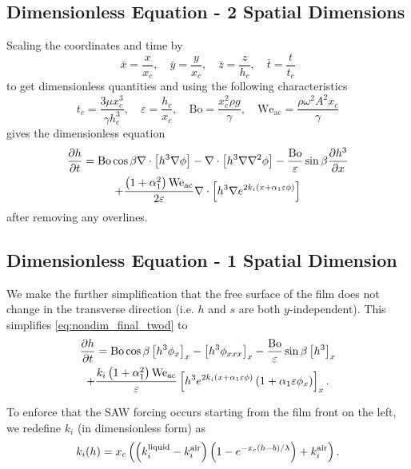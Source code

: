 \subsection{Dimensionless Equation - 2 Spatial Dimensions}
\begin{frame}
    Scaling the coordinates and time by 
    \begin{equation*}
        \bar{x} = \frac{x}{x_c}, \quad \bar{y} = \frac{y}{x_c}, \quad \bar{z} = \frac{z}{h_c}, \quad \bar{t} = \frac{t}{t_c}
    \end{equation*}
    to get dimensionless quantities and using the following characteristics
    \begin{equation*}
        t_c = \frac{3\mu x_c^3}{\gamma h_c^3}, \quad \varepsilon = \frac{h_c}{x_c}, \quad \mathrm{Bo} = \frac{x_c^2\rho g}{\gamma}, \quad \mathrm{We_{ac}} = \frac{\rho \omega^2 A^2x_c}{\gamma}
    \end{equation*}
    gives the dimensionless equation 
    \begin{multline}
        \frac{\partial h}{\partial t} = \mathrm{Bo} \cos\beta \nabla \cdot \left[  h^3 \nabla \phi  \right] - 
        \nabla \cdot \left[ h^3 \nabla\nabla^2\phi  \right] - 
        \frac{\mathrm{Bo}}{\varepsilon} \sin\beta \frac{\partial h^3}{\partial x} \\ + 
        \frac{\left( 1 + \alpha_1^2 \right) \mathrm{We_{ac}}}{2\varepsilon} \nabla \cdot \left[ h^3 \nabla e^{2k_i \left( x + \alpha_1 \varepsilon \phi \right)} \right] 
        \label{eq:nondim_final_twod}
    \end{multline} 
    after removing any overlines.   
\end{frame}
\subsection{Dimensionless Equation - 1 Spatial Dimension}
\begin{frame}
    We make the further simplification that the free surface of the film does not change
    in the transverse direction (i.e.\! $h$ and $s$ are both $y$-independent). 
    This simplifies \cref{eq:nondim_final_twod} to 
    \begin{multline}
        \frac{\partial h}{\partial t} = \mathrm{Bo}\cos\beta \left[ h^3 \phi_x \right]_x - \left[ h^3 \phi_{xxx} \right]_{x} - \frac{\mathrm{Bo}}{\varepsilon} \sin\beta \left[ h^3 \right]_{x} \\ + 
        \frac{k_i \left( 1 + \alpha_1^2 \right)\mathrm{We_{ac}}}{\varepsilon} \left[ h^3 e^{2k_i \left( x + \alpha_1 \varepsilon \phi \right)} \left( 1 + \alpha_1 \varepsilon \phi_x \right) \right]_x.
        \label{eq:nondim_final_oned}
    \end{multline}

    To enforce that the SAW forcing occurs starting from the film front on the left, we redefine 
    $k_i$ (in dimensionless form) as 
    \begin{equation*}
        k_i\!\left( h \right) = x_c \left( \left( k_i^{\text{liquid}} - k_i^{\text{air}} \right)\left( 1 - e^{-x_c(h-b)/\lambda} \right) + k_i^{\text{air}} \right).
        \label{eq:k_i}
    \end{equation*}
\end{frame}